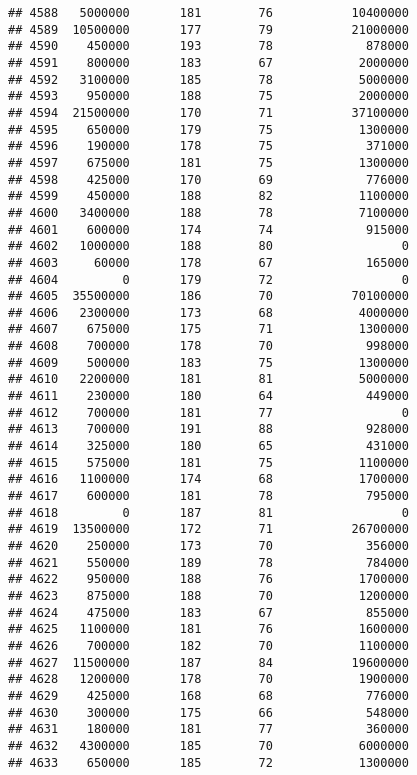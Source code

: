 \documentclass[
]{article}
\begin{document}
\begin{verbatim}
## 4588   5000000       181        76           10400000
## 4589  10500000       177        79           21000000
## 4590    450000       193        78             878000
## 4591    800000       183        67            2000000
## 4592   3100000       185        78            5000000
## 4593    950000       188        75            2000000
## 4594  21500000       170        71           37100000
## 4595    650000       179        75            1300000
## 4596    190000       178        75             371000
## 4597    675000       181        75            1300000
## 4598    425000       170        69             776000
## 4599    450000       188        82            1100000
## 4600   3400000       188        78            7100000
## 4601    600000       174        74             915000
## 4602   1000000       188        80                  0
## 4603     60000       178        67             165000
## 4604         0       179        72                  0
## 4605  35500000       186        70           70100000
## 4606   2300000       173        68            4000000
## 4607    675000       175        71            1300000
## 4608    700000       178        70             998000
## 4609    500000       183        75            1300000
## 4610   2200000       181        81            5000000
## 4611    230000       180        64             449000
## 4612    700000       181        77                  0
## 4613    700000       191        88             928000
## 4614    325000       180        65             431000
## 4615    575000       181        75            1100000
## 4616   1100000       174        68            1700000
## 4617    600000       181        78             795000
## 4618         0       187        81                  0
## 4619  13500000       172        71           26700000
## 4620    250000       173        70             356000
## 4621    550000       189        78             784000
## 4622    950000       188        76            1700000
## 4623    875000       188        70            1200000
## 4624    475000       183        67             855000
## 4625   1100000       181        76            1600000
## 4626    700000       182        70            1100000
## 4627  11500000       187        84           19600000
## 4628   1200000       178        70            1900000
## 4629    425000       168        68             776000
## 4630    300000       175        66             548000
## 4631    180000       181        77             360000
## 4632   4300000       185        70            6000000
## 4633    650000       185        72            1300000

\end{verbatim}
\end{document}
